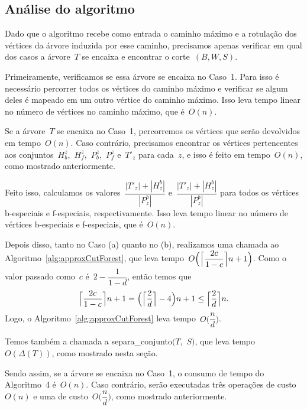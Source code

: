 	\subsection*{Análise do algoritmo}
	Dado que o algoritmo recebe como entrada
	o caminho máximo e a rotulação dos vértices
	da árvore induzida por esse caminho, precisamos apenas verificar em 
	qual dos casos a árvore~$T$ se encaixa
	e encontrar o corte~$(B,W,S)$.

	Primeiramente, verificamos se essa árvore se encaixa no Caso~1.
	Para isso é necessário percorrer todos os vértices do caminho máximo
	e verificar se algum deles é mapeado em um outro vértice do caminho máximo.
	Isso leva tempo linear no número de vértices no caminho máximo, que
	é~$O(n)$.

	Se a árvore~$T$ se encaixa no Caso~1, percorremos os vértices que
	serão devolvidos em tempo~$O(n)$.
	Caso contrário, precisamos encontrar os vértices pertencentes aos 
	conjuntos~$H_b^z$,~$H_f^z$,~$P_b^z$,~$P_f^z$ e~$T'_z$
	para cada~$z$,
	e isso é feito em tempo~$O(n)$, como mostrado anteriormente.


	Feito isso, calculamos os 
	valores~${\dfrac{|T'_{z}|+|H_{z}^b|}{|P^b_{z}|}}$
	e~${\dfrac{|T'_{z}|+|H_{z}^b|}{|P^b_{z}|}}$
	para todos os vértices b-especiais e f-especiais, respectivamente.
	Isso leva tempo linear no número de vértices b-especiais e f-especiais,
	que é~$O(n)$.

	Depois disso, tanto no Caso (a) quanto no (b), realizamos uma chamada ao 
	Algoritmo~\ref{alg:approxCutForest}, que leva 
	tempo~$O\Big(\ceil[\Big]{ \dfrac{2c}{1-c}} n+1\Big)$.
	Como o valor passado como~$c$ é~$2-\dfrac{1}{1-d}$, então
	temos que
	$$ \ceil[\Big]{\dfrac{2c}{1-c}} n+1 
	= \Big(\ceil[\Big]{\dfrac{2}{d}}-4 \Big)n+1 
	\le \ceil[\Big]{\dfrac{2}{d}}n.$$ 
	Logo, o
	Algoritmo~\ref{alg:approxCutForest} leva tempo~$O\Big(\dfrac{n}{d}\Big)$.

	Temos também a chamada a {\sc separa\_conjunto}$(T,$ $S)$, que 
	leva tempo~$O(\Delta(T))$, como mostrado nesta seção.
	
	Sendo assim, se a árvore se encaixa no Caso~1,
	o consumo de tempo do Algoritmo~4 é~$O(n)$.
	Caso contrário, serão executadas três operações de custo~$O(n)$
	e uma de custo~$O\Big(\dfrac{n}{d}\Big)$, como mostrado anteriormente. 
	
